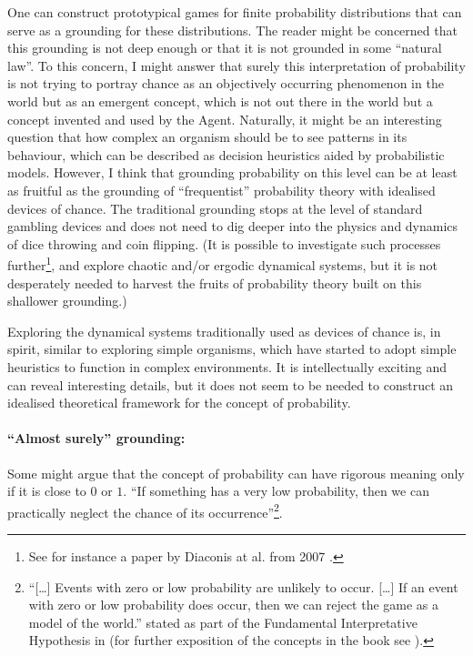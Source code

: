 \documentclass{article}
\begin{document}
One can construct prototypical games for finite probability distributions that can serve as a grounding for these distributions.
The reader might be concerned that this grounding is not deep enough or that it is not grounded in some ``natural law''. To this concern, I might answer that surely this interpretation of probability is not trying to portray chance as an objectively occurring phenomenon in the world but as an emergent concept, which is not out there in the world but a concept invented and used by the Agent.
Naturally, it might be an interesting question that how complex an organism should be to see patterns in its behaviour, which can be described as decision heuristics aided by probabilistic models.
However, I think that grounding probability on this level can be at least as fruitful as the grounding of ``frequentist'' probability theory with idealised devices of chance. The traditional grounding stops at the level of standard gambling devices and does not need to dig deeper into the physics and dynamics of dice throwing and coin flipping. (It is possible to investigate such processes further\footnote{See for instance a paper by Diaconis at al. from 2007 \cite{paper:Diaconis2007}.}, and explore chaotic and/or ergodic dynamical systems, but it is not desperately needed to harvest the fruits of probability theory built on this shallower grounding.)

Exploring the dynamical systems traditionally used as devices of chance is, in spirit, similar to exploring simple organisms, which have started to adopt simple heuristics to function in complex environments. It is intellectually exciting and can reveal interesting details, but it does not seem to be needed to construct an idealised theoretical framework for the concept of probability.



\paragraph{``Almost surely'' grounding:}
Some might argue that the concept of probability can have rigorous meaning only if it is close to $0$ or $1$. ``If something has a very low probability, then we can practically neglect the chance of its occurrence''\footnote{``[\dots] Events with zero or low probability are unlikely to occur. [\dots] If an event with zero or low probability does occur, then we can reject the game as a model of the world.'' stated as part of the Fundamental Interpretative Hypothesis in \cite{book:ProbabilityAndFinanceGame} (for further exposition of the concepts in the book see \cite{book:GameTheoreticProbability}).}.
\end{document}
